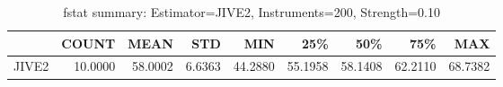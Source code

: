 \begin{table}[ht]
\centering
\caption{fstat summary: Estimator=JIVE2, Instruments=200, Strength=0.10}
\begin{tabular}{lrrrrrrrr}
\toprule
 & COUNT & MEAN & STD & MIN & 25\% & 50\% & 75\% & MAX \\
\midrule
JIVE2 & 10.0000 & 58.0002 & 6.6363 & 44.2880 & 55.1958 & 58.1408 & 62.2110 & 68.7382 \\
\bottomrule
\end{tabular}
\end{table}
